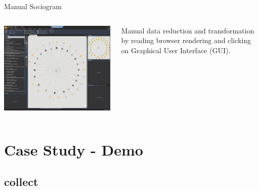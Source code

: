 \documentclass[pdf,aspectratio=169]{beamer}
\begin{document}
\begin{frame}{Manual Sociogram}
  \begin{columns}[c]
    \centering
    \includegraphics[height=0.8\textheight]{maltego-manual-sociogram.png}
    
     Manual data reduction and transformation by
    reading browser rendering and clicking on Graphical User Interface
    (GUI).
  \end{columns}
\end{frame}

\section{Case Study - Demo}

\subsection{collect}
\end{document}
